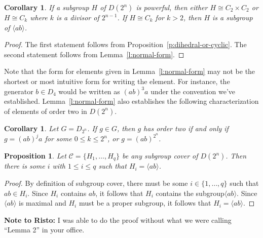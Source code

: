 \documentclass{amsart}
\numberwithin{equation} {section}
\newtheorem{proposition}[equation]{Proposition}
\newtheorem{corollary}[equation]{Corollary}
\theoremstyle{definition}
\begin{document}
\begin{corollary}\label{c:powerful-isomorphism-types} 
If a subgroup $H$ of $D(2^n)$ is powerful, then either $H\cong C_2\times C_2$ or $H\cong C_k$ where $k $ is a divisor of $2^{n-1}$. If $H \cong C_k$ for $k > 2$, then $H$ is a subgroup of $\langle ab \rangle$. 
\end{corollary}

\begin{proof}
The first statement follows from Proposition~\ref{p:dihedral-or-cyclic}. The second statement follows from Lemma~\ref{l:normal-form}. 
\end{proof} 

Note that the form for elements given in Lemma~\ref{l:normal-form} may not be the shortest or most intuitive form for writing the element. For instance, the generator $b \in D_4$ would be written as $(ab)^3a$ under the convention we've established. Lemma~\ref{l:normal-form} also establishes the following characterization of elements of order two in $D(2^n)$. 

\begin{corollary}\label{c:elements-of-order-two}
Let $G = D_{2^n}$. If $g \in G$, then $g$ has order two if and only if $g = (ab)^ja$ for some $0 \leq k \leq 2^n$, or $g = (ab)^{2^n}$. 
\end{corollary} 

\begin{proposition}\label{p:subgroup-cover-must-contain-maximal-cyclic}
Let $\mathcal{C} = \{H_1, \ldots, H_q \}$ be any subgroup cover of $D(2^n)$. Then there is some $i$ with $1 \leq i \leq q$ such that $H_i = \langle ab \rangle$.
\end{proposition}

\begin{proof}
By definition of subgroup cover, there must be some $i \in \{1,\ldots, q\}$ such that $ab\in H_i$. Since $H_i$ contains $ab$, it follows that $H_ i$ contains the subgroup$\langle ab \rangle$. Since $\langle ab \rangle$ is maximal and $H_i$ must be a proper subgroup, it follows that $H_i = \langle ab \rangle$. 
\end{proof}

\textbf{Note to Risto:} I was able to do the proof without what we were calling ``Lemma 2'' in your office. 

\begin{comment}
This was originally included as a Lemma, but I no longer feel it is necessary. 

\begin{proposition}\label{p:how-to-cover-reflections}
Le $B = \{(ab)^ja \mid 0 \leq j \leq 2^{n-1} \}$. Let $\mathcal{C}$ be a collection of subgroups of $D(2^n)$. Then $\mathcal{C}$ is a minimal powerful subgroup cover of $B$ if and only if removing the subgroup $\langle ab \rangle$ from $C$ results in a minimal powerful subgroup cover of $D(2^n)$. 
\end{proposition}

\begin{proof}
todo. 
\end{proof}
\end{comment}
\end{document}

